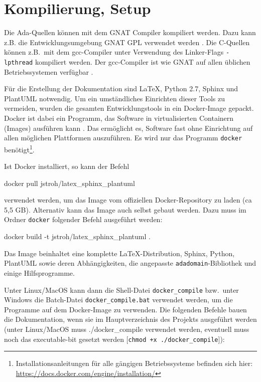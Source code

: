 \documentclass[oneside]{elaboration}
\begin{document}
\section{Kompilierung, Setup}
\label{sec:kompilierung_setup}

Die Ada-Quellen können mit dem GNAT Compiler kompiliert werden. Dazu kann z.B.
die Entwicklungsumgebung GNAT GPL verwendet werden \citep[vgl.][]{GNAT}. Die
C-Quellen können z.B.\ mit dem gcc-Compiler unter Verwendung des Linker-Flags
\texttt{-lpthread} kompiliert werden. Der gcc-Compiler ist wie GNAT auf allen
üblichen Betriebssystemen verfügbar \citep[vgl.][]{GCC}.

Für die Erstellung der Dokumentation sind LaTeX, Python 2.7, Sphinx und PlantUML
notwendig. Um ein umständliches Einrichten dieser Tools zu vermeiden, wurden die
gesamten Entwicklungstools in ein Docker-Image gepackt. Docker ist dabei ein
Programm, das Software in virtualisierten Containern (Images) ausführen kann
\citep[vgl.][]{Docker}. Das ermöglicht es, Software fast ohne Einrichtung auf
allen möglichen Plattformen auszuführen. Es wird nur das Programm
\texttt{docker} benötigt\footnote{Installationsanleitungen für alle gängigen
Betriebssysteme befinden sich hier:
\url{https://docs.docker.com/engine/installation/}}.

Ist Docker installiert, so kann der Befehl

\begin{bashcode}
    docker pull jstroh/latex_sphinx_plantuml
\end{bashcode}

verwendet werden, um das Image vom offiziellen Docker-Repository zu laden (ca
5,5 GB). Alternativ kann das Image auch selbst gebaut werden. Dazu muss im
Ordner \texttt{docker} folgender Befehl ausgeführt werden:

\begin{bashcode}
    docker build -t jstroh/latex_sphinx_plantuml .
\end{bashcode}

Das Image beinhaltet eine komplette LaTeX-Distribution, Sphinx, Python, PlantUML
sowie deren Abhängigkeiten, die angepasste \texttt{adadomain}-Bibliothek und
einige Hilfsprogramme. 

Unter Linux/MacOS kann dann die Shell-Datei \texttt{docker\_compile} bzw.\ unter
Windows die Batch-Datei \texttt{docker_compile.bat} verwendet werden, um die
Programme auf dem Docker-Image zu verwenden. Die folgenden Befehle bauen die
Dokumentation, wenn sie im Hauptverzeichnis des Projekts ausgeführt werden
(unter Linux/MacOS muss ./docker\_compile verwendet werden, eventuell muss noch
das executable-bit gesetzt werden [\texttt{chmod +x ./docker\_compile}]):
\end{document}
